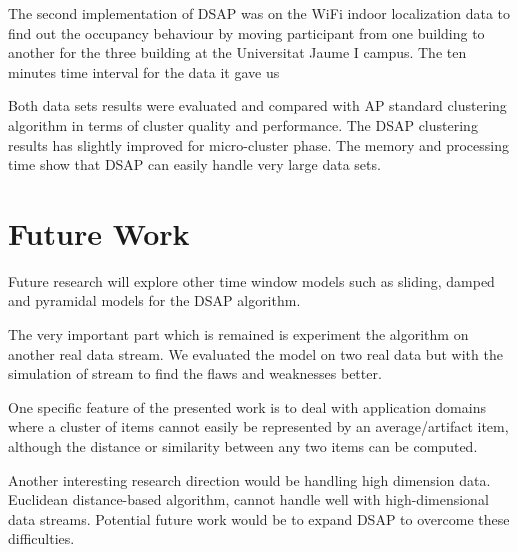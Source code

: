 The second implementation of DSAP was on the WiFi indoor localization data to find out the occupancy behaviour by moving participant from one building to another for the three building at the Universitat Jaume I campus. The ten minutes time interval for the data it gave us 

Both data sets results were evaluated and compared with AP standard clustering algorithm in terms of cluster quality and performance. The DSAP clustering results has slightly improved for micro-cluster phase. The memory and processing time show that DSAP can easily handle very large data sets. 




\section{Future Work}

Future research will explore other time window models such as sliding, damped and pyramidal models for the DSAP algorithm.  

The very important part which is remained is experiment the algorithm on another real data stream. We evaluated the model on two real data but with the simulation of stream to find the flaws and weaknesses better.

One specific feature of the presented work is to deal with application domains where a cluster of items cannot easily be represented by an average/artifact item, although the distance or similarity between any two items can be computed. 

Another interesting research direction would be handling high dimension data. Euclidean distance-based algorithm, cannot handle well with high-dimensional data streams. Potential future work would be to expand DSAP to overcome these difficulties.






